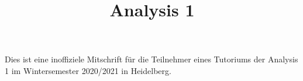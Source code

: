 \documentclass{scrartcl}[a4paper, 12pt]
\title{Analysis 1}
\author{}
\date{}
\begin{document}
\maketitle 
    Dies ist eine inoffiziele Mitschrift für die Teilnehmer eines Tutoriums der Analysis 1 im Wintersemester 2020/2021 in Heidelberg.
    
    
    
\end{document}
